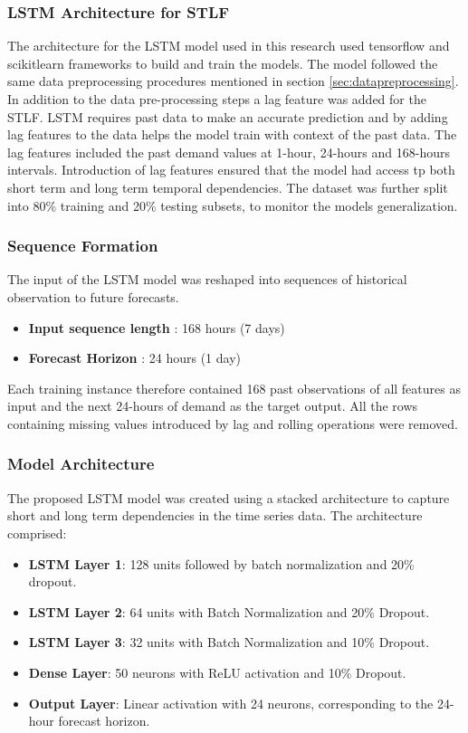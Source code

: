  \subsubsection{LSTM Architecture for STLF}
 
 The architecture for the LSTM model used in this research used tensorflow and scikitlearn frameworks to build and train the models. The model followed the same data preprocessing procedures mentioned in section \ref{sec:datapreprocessing}. In addition to the data pre-processing steps a lag feature was added for the STLF. LSTM requires past data to make an accurate prediction and by adding lag features to the data helps the model train with context of the past data. The lag features included the past demand values at 1-hour, 24-hours and 168-hours intervals. Introduction of lag features ensured that the model had access tp both short term and long term temporal dependencies. The dataset was further split into 80\% training and 20\% testing subsets, to monitor the models generalization.
 
 \subsubsection{Sequence Formation}
 The input of the LSTM model was reshaped into sequences of historical observation to future forecasts.
 {\small
 \begin{itemize}
 	\item \textbf{Input sequence length} : 168 hours (7 days)
 	\item \textbf{Forecast Horizon} : 24 hours (1 day)
 \end{itemize}
}
 Each training instance therefore contained 168 past observations of all features as input and the next 24-hours of demand as the target output. All the rows containing missing values introduced by lag and rolling operations were removed.
 
 \subsubsection{Model Architecture}
 
 The proposed LSTM model was created using a stacked architecture to capture short and long term dependencies in the time series data. The architecture comprised: 
 {\small 
 \begin{itemize}
 	\item \textbf{LSTM Layer 1}: 128 units followed by batch normalization and 20\% dropout.
 	\item \textbf{LSTM Layer 2}: 64 units with Batch Normalization and 20\% Dropout.
 	
 	\item\textbf{LSTM Layer 3}: 32 units with Batch Normalization and 10\% Dropout.
 	
 	\item \textbf{Dense Layer}: 50 neurons with ReLU activation and 10\% Dropout.
 	
   \item\textbf{ Output Layer}: Linear activation with 24 neurons, corresponding to the 24-hour forecast horizon.
 \end{itemize}
}
 
